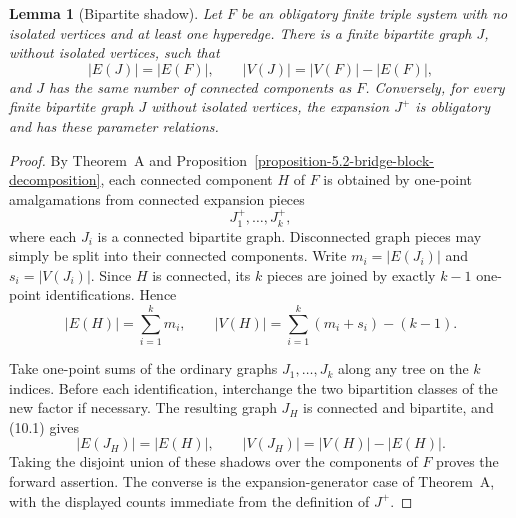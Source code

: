 \documentclass[a4paper,11pt,reqno]{amsart}
\theoremstyle{plain}
\newtheorem{lemma}[theorem]{Lemma}
\theoremstyle{definition}
\theoremstyle{remark}
\begin{document}
\begin{lemma}[Bipartite shadow]
\label{lemma-bipartite-shadow}
Let $F$ be an obligatory finite triple system with no isolated vertices and
at least one hyperedge.  There is a finite bipartite graph $J$, without
isolated vertices, such that
\[
|E(J)|=|E(F)|,\qquad |V(J)|=|V(F)|-|E(F)|,
\]
and $J$ has the same number of connected components as $F$.  Conversely, for
every finite bipartite graph $J$ without isolated vertices, the expansion
$J^+$ is obligatory and has these parameter relations.
\end{lemma}
\begin{proof}
By Theorem~A and Proposition~\ref{proposition-5.2-bridge-block-decomposition},
each connected component $H$ of $F$ is obtained by one-point amalgamations
from connected expansion pieces
\[
J_1^+,\ldots,J_k^+,
\]
where each $J_i$ is a connected bipartite graph.  Disconnected graph pieces
may simply be split into their connected components.  Write
$m_i=|E(J_i)|$ and $s_i=|V(J_i)|$.  Since $H$ is connected, its $k$ pieces
are joined by exactly $k-1$ one-point identifications.  Hence
\[
|E(H)|=\sum_{i=1}^k m_i,
\qquad
|V(H)|=\sum_{i=1}^k(m_i+s_i)-(k-1).
\tag{10.1}
\]

Take one-point sums of the ordinary graphs $J_1,\ldots,J_k$ along any tree on
the $k$ indices.  Before each identification, interchange the two
bipartition classes of the new factor if necessary.  The resulting graph
$J_H$ is connected and bipartite, and (10.1) gives
\[
|E(J_H)|=|E(H)|,
\qquad
|V(J_H)|=|V(H)|-|E(H)|.
\]
Taking the disjoint union of these shadows over the components of $F$ proves
the forward assertion.  The converse is the expansion-generator case of
Theorem~A, with the displayed counts immediate from the definition of $J^+$.
\end{proof}
\end{document}
